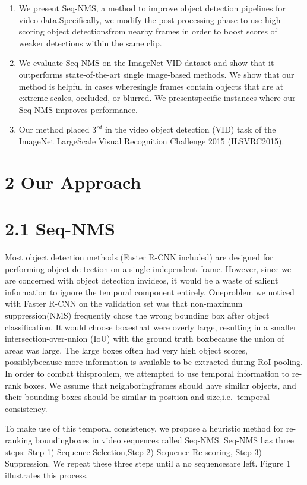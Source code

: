 \documentclass[
  10
]{article}
\begin{document}
\begin{enumerate}
\def\labelenumi{\arabic{enumi}.}
\item
  We present Seq-NMS, a method to improve object detection pipelines for
  video data.Specifically, we modify the post-processing phase to use
  high-scoring object detectionsfrom nearby frames in order to boost
  scores of weaker detections within the same clip.
\item
  We evaluate Seq-NMS on the ImageNet VID dataset and show that it
  outperforms state-of-the-art single image-based methods. We show that
  our method is helpful in cases wheresingle frames contain objects that
  are at extreme scales, occluded, or blurred. We presentspecific
  instances where our Seq-NMS improves performance.
\item
  Our method placed \(3 ^ { r d }\) in the video object detection (VID)
  task of the ImageNet LargeScale Visual Recognition Challenge 2015
  (ILSVRC2015).
\end{enumerate}

\section{2 Our Approach}\label{our-approach}

\section{2.1 Seq-NMS}\label{seq-nms}

Most object detection methods (Faster R-CNN included) are designed for
performing object de-tection on a single independent frame. However,
since we are concerned with object detection invideos, it would be a
waste of salient information to ignore the temporal component entirely.
Oneproblem we noticed with Faster R-CNN on the validation set was that
non-maximum suppression(NMS) frequently chose the wrong bounding box
after object classification. It would choose boxesthat were overly
large, resulting in a smaller intersection-over-union (IoU) with the
ground truth boxbecause the union of areas was large. The large boxes
often had very high object scores, possiblybecause more information is
available to be extracted during RoI pooling. In order to combat
thisproblem, we attempted to use temporal information to re-rank boxes.
We assume that neighboringframes should have similar objects, and their
bounding boxes should be similar in position and size,i.e.~temporal
consistency.

To make use of this temporal consistency, we propose a heuristic method
for re-ranking boundingboxes in video sequences called Seq-NMS. Seq-NMS
has three steps: Step 1) Sequence Selection,Step 2) Sequence Re-scoring,
Step 3) Suppression. We repeat these three steps until a no sequencesare
left. Figure 1 illustrates this process.
\end{document}

